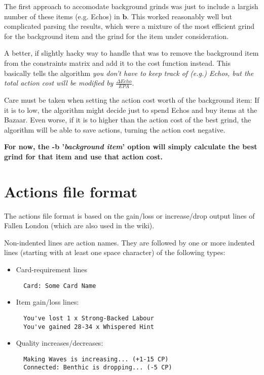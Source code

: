 \documentclass[a4paper,11pt,openright,twoside]{scrartcl}
\begin{document}
The first approach to accomodate background grinds was just to include a largish number of these items (e.g. Echos) in $\mathbf{b}$. This worked reasonably well but complicated parsing the results, which were a mixture of the most efficient grind for the background item and the grind for the item under consideration.

A better, if slightly hacky way to handle that was to remove the background item from the constraints matrix and add it to the cost function instead. This basically tells the algorithm \emph{you don't have to keep track of (e.g.) Echos, but the total action cost will be modified by $\frac{\Delta Echo}{EPA}$}.

Care must be taken when setting the action cost worth of the background item: If it is to low, the algorithm might decide just to spend Echos and buy items at the Bazaar. Even worse, if it is to higher than the action cost of the best grind, the algorithm will be able to save actions, turning the action cost negative. 

\textbf{For now, the -b '\emph{background item}' option will simply calculate the best grind for that item and use that action cost.}

\section{Actions file format}

The actions file format is based on the gain/loss or increase/drop output lines of Fallen London (which are also used in the wiki).

Non-indented lines are action names. They are followed by one or more indented lines (starting with at least one space character) of the following types:
\begin{itemize}
\item Card-requirement lines
\begin{lstlisting}
  Card: Some Card Name
\end{lstlisting}
\item Item gain/loss lines:
\begin{lstlisting}
  You've lost 1 x Strong-Backed Labour
  You've gained 28-34 x Whispered Hint
\end{lstlisting}
\item Quality increases/decreases:
\begin{lstlisting}
  Making Waves is increasing... (+1-15 CP)
  Connected: Benthic is dropping... (-5 CP)
\end{lstlisting}
\end{itemize}
\end{document}

